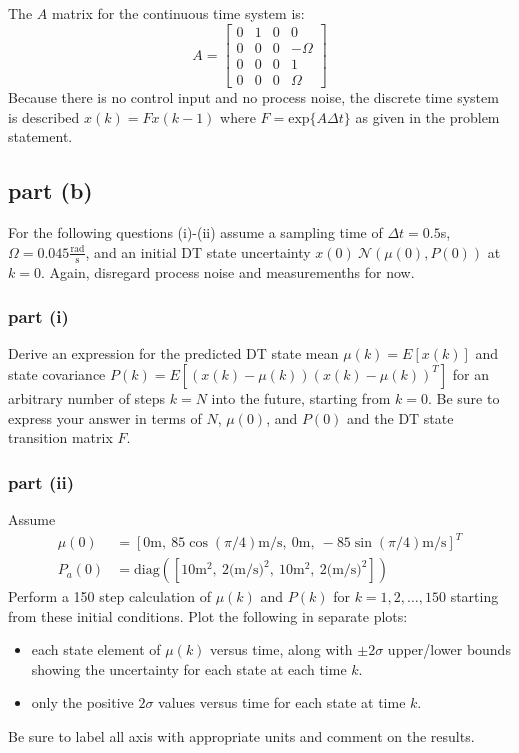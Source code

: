 \documentclass[11pt]{article}
\begin{document}
\subparagraph*{}
The $A$ matrix for the continuous time system is:
\begin{equation*}
	A = \begin{bmatrix} 0 & 1 & 0 & 0 \\
											0 & 0 & 0 & -\Omega \\
											0 & 0 & 0 & 1 \\
											0 & 0 & 0 & \Omega \end{bmatrix}
\end{equation*}
Because there is no control input and no process noise, the discrete time system is described $x(k)=Fx(k-1)$ where $F=\text{exp}\{A\Delta t\}$ as given in the problem statement.


\subsection*{part (b)}
For the following questions (i)-(ii) assume a sampling time of $\Delta t=0.5$s, $\Omega=0.045\frac{\text{rad}}{\text{s}}$, and an initial DT state uncertainty $x(0)~\mathcal{N}(\mu(0),P(0))$ at $k=0$. Again, disregard process noise and measuremenths for now.

\subsubsection*{part (i)}
Derive an expression for the predicted DT state mean $\mu(k)=E[x(k)]$ and state covariance $P(k)=E[(x(k)-\mu(k))(x(k)-\mu(k))^T]$ for an arbitrary number of steps $k=N$ into the future, starting from $k=0$. Be sure to express your answer in terms of $N$, $\mu(0)$, and $P(0)$ and the DT state transition matrix $F$.

\subsubsection*{part (ii)}
Assume
\begin{align*}
	\mu(0) &= [0\text{m},\ 85\cos(\pi/4)\text{m/s},\ 0\text{m},\ -85\sin(\pi/4)\text{m/s}]^T \\
	P_a(0) &= \text{diag}([10\text{m}^2,\ 2\text{(m/s)}^2,\ 10\text{m}^2,\ 2\text{(m/s)}^2])
\end{align*}
Perform a 150 step calculation of $\mu(k)$ and $P(k)$ for $k=1,2,\dots,150$ starting from these initial conditions. Plot the following in separate plots:
\begin{itemize}
	\item each state element of $\mu(k)$ versus time, along with $\pm2\sigma$ upper/lower bounds showing the uncertainty for each state at each time $k$.
	\item only the positive $2\sigma$ values versus time for each state at time $k$.
\end{itemize}
Be sure to label all axis with appropriate units and comment on the results.
\end{document}
